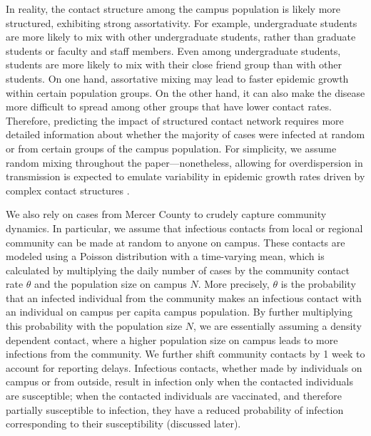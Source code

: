 \documentclass[12pt]{article}
\begin{document}
In reality, the contact structure among the campus population is likely more structured, exhibiting strong assortativity.
For example, undergraduate students are more likely to mix with other undergraduate students, rather than graduate students or faculty and staff members.
Even among undergraduate students, students are more likely to mix with their close friend group than with other students.
On one hand, assortative mixing may lead to faster epidemic growth within certain population groups.
On the other hand, it can also make the disease more difficult to spread among other groups that have lower contact rates.
Therefore, predicting the impact of structured contact network requires more detailed information about whether the majority of cases were infected at random or from certain groups of the campus population.
For simplicity, we assume random mixing throughout the paper---nonetheless, allowing for overdispersion in transmission is expected to emulate variability in epidemic growth rates driven by complex contact structures \citep{lloyd2005superspreading}.

We also rely on cases from Mercer County to crudely capture community dynamics.
In particular, we assume that infectious contacts from local or regional community can be made at random to anyone on campus.
These contacts are modeled using a Poisson distribution with a time-varying mean, which is calculated by multiplying the daily number of cases by the community contact rate $\theta$ and the population size on campus $N$.
More precisely, $\theta$ is the probability that an infected individual from the community makes an infectious contact with an individual on campus per capita campus population. 
By further multiplying this probability with the population size $N$, we are essentially assuming a density dependent contact, where a higher population size on campus leads to more infections from the community.
We further shift community contacts by 1 week to account for reporting delays.
Infectious contacts, whether made by individuals on campus or from outside, result in infection only when the contacted individuals are susceptible; when the contacted individuals are vaccinated, and therefore partially susceptible to infection, they have a reduced probability of infection corresponding to their susceptibility (discussed later).
\end{document}
